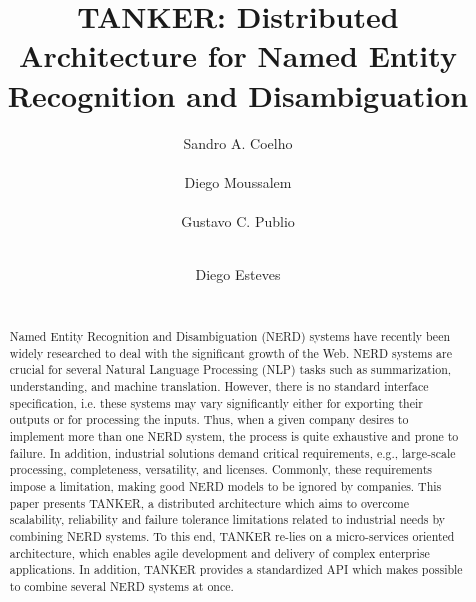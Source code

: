 \documentclass{sig-alternate}
\begin{document}
\title{TANKER: Distributed Architecture for Named Entity Recognition and Disambiguation}

\author{
\alignauthor
Sandro A. Coelho\\
\\
\alignauthor
Diego Moussalem\\
\\
\alignauthor
Gustavo C. Publio\\
\\
\and
\alignauthor
Diego Esteves\\
\\
}
\maketitle

\begin{abstract}
Named Entity Recognition and Disambiguation (NERD) systems have recently been widely researched to deal with the significant growth of the Web. NERD systems are crucial for several Natural Language Processing (NLP) tasks such as summarization, understanding, and machine translation. However, there is no standard interface specification, i.e. these systems may vary significantly either for exporting their outputs or for processing the inputs. Thus, when a given company desires to implement more than one NERD system, the process is quite exhaustive and prone to failure. In addition, industrial solutions demand critical requirements, e.g., large-scale processing, completeness, versatility, and licenses. Commonly, these requirements impose a limitation, making good NERD models to be ignored by companies. This paper presents TANKER, a distributed architecture which aims to overcome scalability, reliability and failure tolerance limitations related to industrial needs by combining NERD systems. To this end, TANKER re-lies on a micro-services oriented architecture, which enables agile development and delivery of complex enterprise applications. In addition, TANKER provides a standardized API which makes possible to combine several NERD systems at once.
\end{abstract}
\end{document}
